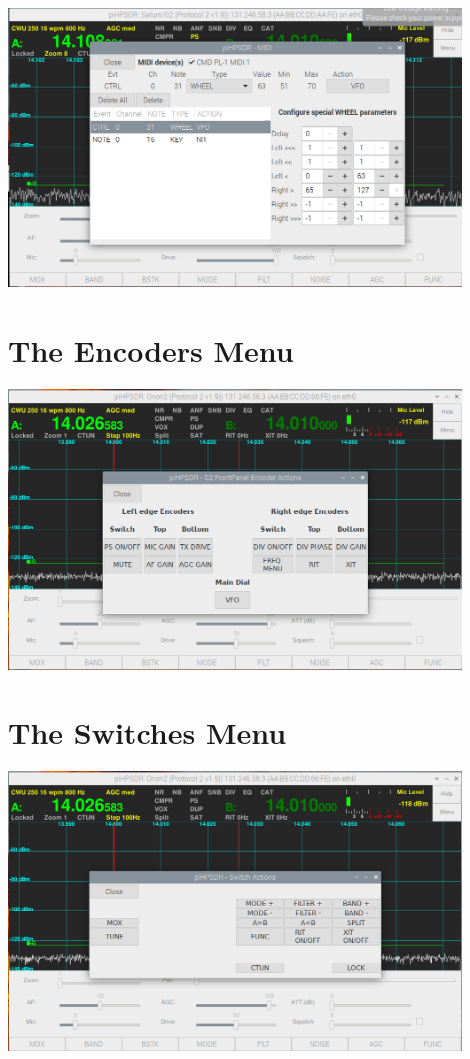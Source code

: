 \documentclass[12pt]{book}
\begin{document}
\begin{center}
\includegraphics[width=12cm]{MIDImenu3.png}
\end{center}
 
\section{The Encoders Menu}
\begin{center}
\includegraphics[width=12cm]{EncodersMenu.png}
\end{center}

\section{The Switches Menu}
\begin{center}
\includegraphics[width=12cm]{SwitchesMenu.png}
\end{center}
\end{document}
